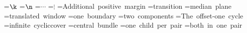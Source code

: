\documentclass[10pt]{article}
\begin{document}
=\hbox{\(\k\)}
=\hbox{\(\n\)}
=\hbox{\(\cdots\)}
=\hbox{\(\vdots\)}
=\hbox{Additional positive margin}
=\hbox{transition}
=\hbox{median plane}
=\hbox{translated window}
=\hbox{one boundary}
=\hbox{two components}
=\hbox{The offset-one cycle}
=\hbox{infinite cyclic\\cover}
=\hbox{central bundle}
=\hbox{one child per pair}
=\hbox{both in one pair}
\end{document}
